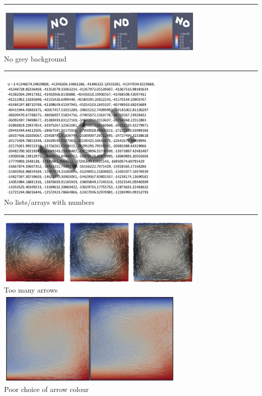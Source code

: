 \par\noindent\rule{\textwidth}{0.4pt}
\begin{center}
\includegraphics[width=10cm]{images/grading/grey}\\
No grey background
\end{center}


\par\noindent\rule{\textwidth}{0.4pt}
\begin{center}
\includegraphics[width=8cm]{images/grading/numbers}\\
No lists/arrays with numbers
\end{center}

\par\noindent\rule{\textwidth}{0.4pt}
\begin{center}
\includegraphics[width=10cm]{images/grading/arrows2}\\
Too many arrows\\
\includegraphics[width=9cm]{images/grading/arrows1}\\
Poor choice of arrow colour
\end{center}

